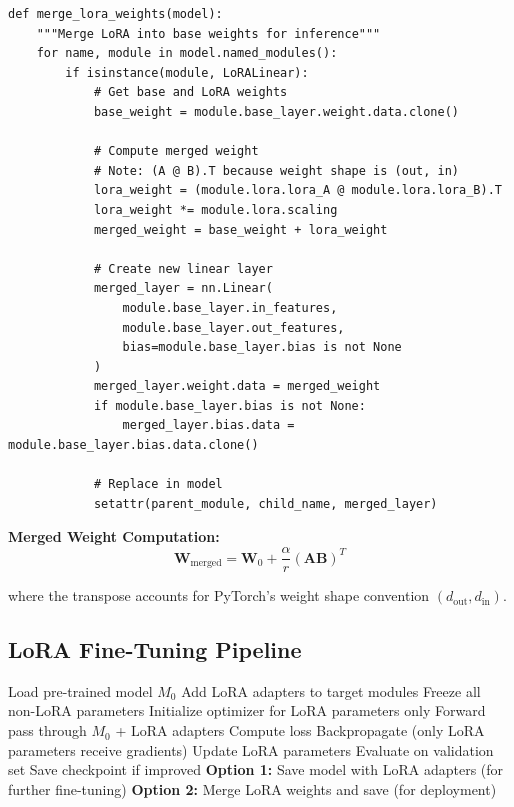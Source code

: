 \documentclass[11pt,a4paper]{article}
\begin{document}
\begin{lstlisting}[caption={Merge LoRA Weights (lines 318-364)}]
def merge_lora_weights(model):
    """Merge LoRA into base weights for inference"""
    for name, module in model.named_modules():
        if isinstance(module, LoRALinear):
            # Get base and LoRA weights
            base_weight = module.base_layer.weight.data.clone()

            # Compute merged weight
            # Note: (A @ B).T because weight shape is (out, in)
            lora_weight = (module.lora.lora_A @ module.lora.lora_B).T
            lora_weight *= module.lora.scaling
            merged_weight = base_weight + lora_weight

            # Create new linear layer
            merged_layer = nn.Linear(
                module.base_layer.in_features,
                module.base_layer.out_features,
                bias=module.base_layer.bias is not None
            )
            merged_layer.weight.data = merged_weight
            if module.base_layer.bias is not None:
                merged_layer.bias.data = module.base_layer.bias.data.clone()

            # Replace in model
            setattr(parent_module, child_name, merged_layer)
\end{lstlisting}

\textbf{Merged Weight Computation:}
\begin{equation}
\mathbf{W}_{\text{merged}} = \mathbf{W}_0 + \frac{\alpha}{r} (\mathbf{A} \mathbf{B})^T
\end{equation}

where the transpose accounts for PyTorch's weight shape convention $(d_{\text{out}}, d_{\text{in}})$.

\subsection{LoRA Fine-Tuning Pipeline}

\begin{algorithm}
\caption{LoRA Fine-Tuning}
\begin{algorithmic}[1]
\State Load pre-trained model $M_0$
\State Add LoRA adapters to target modules
\State Freeze all non-LoRA parameters
\State Initialize optimizer for LoRA parameters only
        \State Forward pass through $M_0$ + LoRA adapters
        \State Compute loss
        \State Backpropagate (only LoRA parameters receive gradients)
        \State Update LoRA parameters
    \EndFor
    \State Evaluate on validation set
    \State Save checkpoint if improved
\EndFor
\State \textbf{Option 1:} Save model with LoRA adapters (for further fine-tuning)
\State \textbf{Option 2:} Merge LoRA weights and save (for deployment)
\end{algorithmic}
\end{algorithm}
\end{document}
